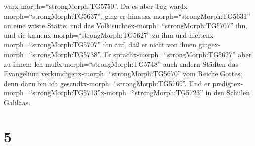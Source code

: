 warx-morph=``strongMorph:TG5750''.  Da es aber Tag
wardx-morph=``strongMorph:TG5637'', ging er
hinausx-morph=``strongMorph:TG5631'' an eine wüste Stätte; und das Volk
suchtex-morph=``strongMorph:TG5707'' ihn, und sie
kamenx-morph=``strongMorph:TG5627'' zu ihm und
hieltenx-morph=``strongMorph:TG5707'' ihn auf, daß er nicht von ihnen
gingex-morph=``strongMorph:TG5738''.  Er
sprachx-morph=``strongMorph:TG5627'' aber zu ihnen: Ich
mußx-morph=``strongMorph:TG5748'' auch andern Städten das Evangelium
verkündigenx-morph=``strongMorph:TG5670'' vom Reiche Gottes; denn dazu
bin ich gesandtx-morph=``strongMorph:TG5769''.  Und er
predigtex-morph=``strongMorph:TG5713''x-morph=``strongMorph:TG5723'' in
den Schulen Galiläas.

\hypertarget{section-4}{%
\section{5}\label{section-4}}

